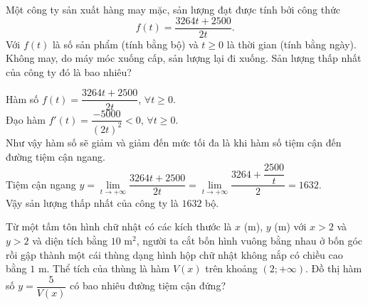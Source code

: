 \begin{bt}%

	Một công ty sản xuất hàng may mặc, sản lượng đạt được tính bởi công thức $$f(t)=\dfrac{3264t + 2500}{2t}.$$
	Với $f(t)$ là số sản phẩm (tính bằng bộ) và $t\ge 0$ là thời gian (tính bằng ngày).
	Không may, do máy móc xuống cấp, sản lượng lại đi xuống. Sản lượng thấp nhất của công ty đó là bao nhiêu?
	
	\loigiai
	{
		Hàm số $f(t) = \dfrac{3264t + 2500}{2t}$, $\forall t \ge 0$.\\
		Đạo hàm $f'(t) = \dfrac{-5000}{(2t)^2}<0$, $\forall t \ge 0$.\\
		Như vậy hàm số sẽ giảm và giảm đến mức tối đa là khi hàm số tiệm cận đến đường tiệm cận ngang.\\
		Tiệm cận ngang $y=\lim\limits_{t \to +\infty} \dfrac{3264t + 2500}{2t} =\lim\limits_{t \to +\infty} \dfrac{3264 + \dfrac{2500}{t}}{2} = 1632$.\\
		Vậy sản lượng thấp nhất của công ty là $1632$ bộ.
	}
\end{bt}

\begin{bt}%

	Từ một tấm tôn hình chữ nhật có các kích thước là $x$ (m), $y$ (m) với $x>2$ và $y>2$ và diện tích bằng $10$ m$^2$, người ta cắt bốn hình vuông bằng nhau ở bốn góc rồi gập thành một cái thùng dạng hình hộp chữ nhật không nắp có chiều cao bằng $1$ m. Thể tích của thùng là hàm  $V(x)$ trên khoảng $(2 ;+\infty)$. Đồ thị hàm số $y=\dfrac{5}{V(x)}$ có bao nhiêu đường tiệm cận đứng?
\end{bt}

